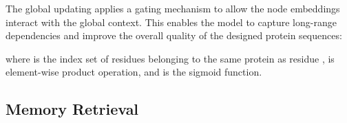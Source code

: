 \documentclass{article}
\begin{document}
The global updating applies a gating mechanism to allow the node embeddings interact with the global context. This enables the model to capture long-range dependencies and improve the overall quality of the designed protein sequences:

where  is the index set of residues belonging to the same protein as residue ,  is element-wise product operation, and  is the sigmoid function. 




\subsection{Memory Retrieval}
\vspace{-3mm}
\end{document}
